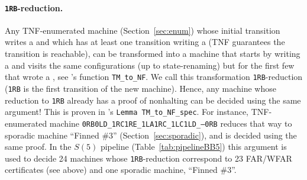 \paragraph{\texttt{1RB}-reduction.} Any TNF-enumerated machine (Section~\ref{sec:enum}) whose initial transition writes a \szero and which has at least one transition writing a \sone (TNF guarantees the transition is reachable), can be transformed into a machine that starts by writing a \sone and visits the same configurations (up to state-renaming) but for the first few that wrote a \szero, see \CoqBB's function \texttt{TM\_to\_NF}. We call this transformation \texttt{1RB}-reduction (\texttt{1RB} is the first transition of the new machine). Hence, any machine whose reduction to \texttt{1RB} already has a proof of nonhalting can be decided using the same argument! This is proven in \CoqBB's \texttt{Lemma TM\_to\_NF\_spec}. For instance, TNF-enumerated machine \texttt{0RB0LD\_1RC1RE\_1LA1RC\_1LC1LD\_---0RB} reduces that way to sporadic machine ``Finned \#3'' (Section~\ref{sec:sporadic}), and is decided using the same proof. In the $S(5)$ pipeline (Table~\ref{tab:pipelineBB5}) this argument is used to decide 24 machines whose \texttt{1RB}-reduction correspond to 23 FAR/WFAR certificates (see above) and one sporadic machine, ``Finned \#3''.

